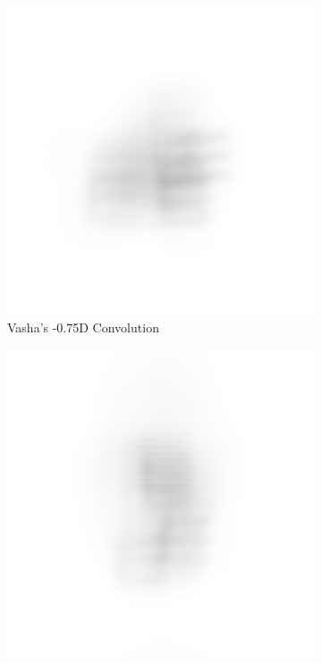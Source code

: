 \documentclass{article}
\begin{document}
\begin{figure}[H]
\begin{subfigure}{.3\textwidth}
  \centering
  \includegraphics[width=1\linewidth]{Vasha_R_G_0530_2_500_zer_-05_5_PSF_convE.png}
  \caption{Vasha's -0.75D Convolution}
  \label{fig:vashan05d}
\end{subfigure}
\begin{subfigure}{.3\textwidth}
  \centering
  \includegraphics[width=1\linewidth]{Liz_R_G_0523_2_500_zer_-05_5_PSF_convE.png}

\end{subfigure}
\end{figure}
\end{document}
